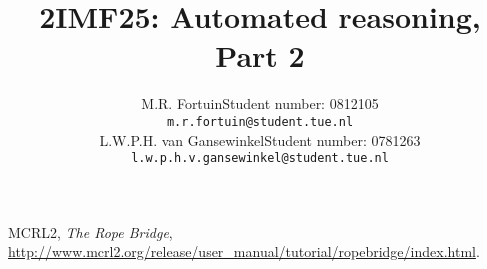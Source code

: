 \documentclass[11pt,a4paper]{report}
\title{2IMF25: Automated reasoning, Part 2}
\author{
M.R. Fortuin\qquad Student number: 0812105 \\{\tt m.r.fortuin@student.tue.nl}\\
L.W.P.H. van Gansewinkel\qquad Student number: 0781263 \\{\tt l.w.p.h.v.gansewinkel@student.tue.nl}\\
}
\begin{document}
\maketitle

\setcounter{tocdepth}{1}
\tableofcontents





\begin{thebibliography}{9}
	
	MCRL2,
	\emph{The Rope Bridge},
	\url{http://www.mcrl2.org/release/user_manual/tutorial/ropebridge/index.html}.
	
\end{thebibliography}
\end{document}
